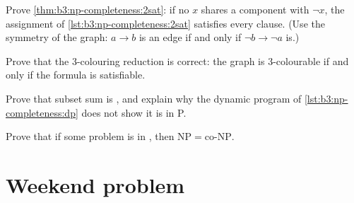 \begin{exercise}[$\star\star$]\label{exo:b3:np-completeness:9}
Prove \cref{thm:b3:np-completeness:2sat}: if no $x$ shares a component with $\neg x$, the assignment of \cref{lst:b3:np-completeness:2sat} satisfies every clause. (Use the symmetry of the graph: $a \to b$ is an edge if and only if $\neg b \to \neg a$ is.)
\end{exercise}

\begin{exercise}[$\star\star\star$]\label{exo:b3:np-completeness:10}
Prove that the 3-colouring reduction is correct: the graph is 3-colourable if and only if the formula is satisfiable.
\end{exercise}

\begin{exercise}[$\star\star\star$]\label{exo:b3:np-completeness:11}
Prove that subset sum is , and explain why the dynamic program of \cref{lst:b3:np-completeness:dp} does not show it is in P.
\end{exercise}

\begin{exercise}[$\star\star\star$]\label{exo:b3:np-completeness:12}
Prove that if some  problem is in , then $\mathrm{NP} = \mathrm{co\text{-}NP}$.
\end{exercise}

\section{Weekend problem}\label{sec:b3:np-completeness:problem}

